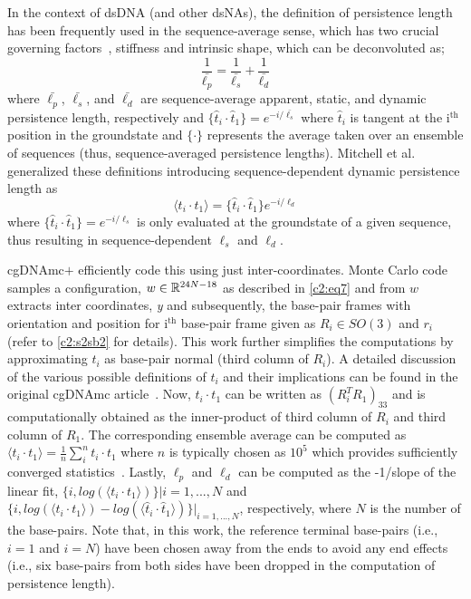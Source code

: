 In the context of dsDNA (and other dsNAs), the definition of persistence length has been frequently used in the sequence-average sense, which has two crucial governing factors~\cite{trifonov1987dna}, stiffness and intrinsic shape, which can be deconvoluted as;
\begin{equation}
\frac{1}{\bar{\ell_p}} = \frac{1}{\bar{\ell_s}} + \frac{1}{\bar{\ell_d}}
\label{c2:eq_persis2}
\end{equation}
where $\bar{\ell_p}$, $\bar{\ell_s}$, and $\bar{\ell_d}$ are sequence-average apparent, static, and dynamic persistence length, respectively and  $\{ \hat{t}_i \cdot \hat{t}_1  \} = e^{-i/\bar{\ell_s}}$ where $\hat{t}_i$ is tangent at the i$^\text{th}$ position in the groundstate and $\{\cdot\}$ represents the average taken over an ensemble of sequences (thus, sequence-averaged persistence lengths).
Mitchell et al.~\cite{cgdnamc} generalized these definitions introducing sequence-dependent dynamic persistence length as 
\begin{equation}
\langle t_i \cdot t_1  \rangle = \{ \hat{t}_i \cdot \hat{t}_1  \} e^{-i/\ell_d}
\label{c2:eq_persis3}
\end{equation}
where $\{ \hat{t}_i \cdot \hat{t}_1  \}=e^{-i/\ell_s}$ is only evaluated at the groundstate of a given sequence, thus resulting in sequence-dependent $\ell_s$ and $\ell_d$.

cgDNAmc$+$ efficiently code this using just inter-coordinates.
Monte Carlo code samples a configuration, $w \in {\mathbb R}^{24N-18}$ as described in \cref{c2:eq7} and from $w$ extracts inter coordinates, \textit{y} and subsequently, the base-pair frames with orientation and position for i$^\text{th}$ base-pair frame given as $R_i \in SO(3)$ and $r_i$ (refer to \cref{c2:s2sb2} for details).
This work further simplifies the computations by approximating $t_i$ as base-pair normal (third column of $R_i$).
A detailed discussion of the various possible definitions of $t_i$ and their implications can be found in the original cgDNAmc article~\cite{cgdnamc}.
Now, $ t_i \cdot t_1 $ can be written as $(R_i^TR_1)_{33}$ and is computationally obtained as the inner-product of third column of $R_i$ and third column of $R_1$. 
The corresponding ensemble average can be computed as $\langle t_i \cdot t_1  \rangle = \frac{1}{n} \sum_i^n t_i \cdot t_1$ where $n$ is typically chosen as $10^5$ which provides sufficiently converged statistics~\cite{patelithesis}.
Lastly, $\ell_p$ and $\ell_d$ can be computed as the -1/slope of the linear fit, $\{ i,log(\langle t_i \cdot t_1  \rangle)\}|i=1,...,N$ and $\{i,log(\langle t_i \cdot t_1  \rangle) - log(\langle \hat{t}_i \cdot \hat{t}_1 \rangle )\}|_{i=1,...,N}$, respectively, where $N$ is the number of the base-pairs. 
Note that, in this work, the reference terminal base-pairs (i.e., $i=1$ and $i=N$) have been chosen away from the ends to avoid any end effects (i.e., six base-pairs from both sides have been dropped in the computation of persistence length).